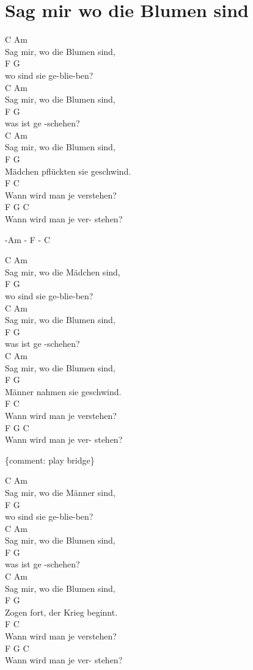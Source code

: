 \documentclass[
  letterpaper,
]{scrbook}
\begin{document}
\hypertarget{sag-mir-wo-die-blumen-sind}{%
\chapter{Sag mir wo die Blumen sind}\label{sag-mir-wo-die-blumen-sind}}

C Am\\
Sag mir, wo die Blumen sind,\\
F G\\
wo sind sie ge-blie-ben?\\
C Am\\
Sag mir, wo die Blumen sind,\\
F G\\
was ist ge -schehen?\\
C Am\\
Sag mir, wo die Blumen sind,\\
F G\\
Mädchen pflückten sie geschwind.\\
F C\\
Wann wird man je verstehen?\\
F G C\\
Wann wird man je ver- stehen?

-Am - F - C

C Am\\
Sag mir, wo die Mädchen sind,\\
F G\\
wo sind sie ge-blie-ben?\\
C Am\\
Sag mir, wo die Blumen sind,\\
F G\\
was ist ge -schehen?\\
C Am\\
Sag mir, wo die Blumen sind,\\
F G\\
Männer nahmen sie geschwind.\\
F C\\
Wann wird man je verstehen?\\
F G C\\
Wann wird man je ver- stehen?

\{comment: play bridge\}

C Am\\
Sag mir, wo die Männer sind,\\
F G\\
wo sind sie ge-blie-ben?\\
C Am\\
Sag mir, wo die Blumen sind,\\
F G\\
was ist ge -schehen?\\
C Am\\
Sag mir, wo die Blumen sind,\\
F G\\
Zogen fort, der Krieg beginnt.\\
F C\\
Wann wird man je verstehen?\\
F G C\\
Wann wird man je ver- stehen?
\end{document}
